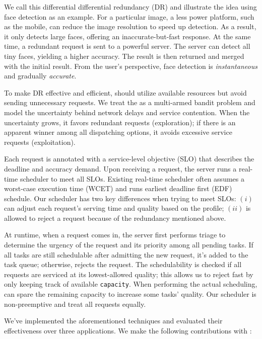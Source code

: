 We call this differential differential redundancy (DR) and illustrate the idea
using face detection as an example. For a particular image, a less power
platform, such as the mobile, can reduce the image resolution to speed up
detection. As a result, it only detects large faces, offering an
inaccurate-but-fast response. At the same time, a redundant request is sent to a
powerful server. The server can detect all tiny faces, yielding a higher
accuracy. The result is then returned and merged with the initial result. From
the user's perspective, face detection is \emph{instantaneous} and gradually
\emph{accurate}.

To make DR effective and efficient, \sysname{} should utilize available
resources but avoid sending unnecessary requests. We treat the as a multi-armed
bandit problem and model the uncertainty behind network delays and service
contention. When the uncertainty grows, it favors redundant requests
(exploration); if there is an apparent winner among all dispatching options, it
avoids excessive service requests (exploitation).

 Each request is annotated with a
service-level objective (SLO) that describes the deadline and accuracy
demand. Upon receiving a request, the server runs a real-time scheduler to meet
all SLOs. Existing real-time scheduler often assumes a worst-case execution time
(WCET) and runs earliest deadline first (EDF) schedule. Our scheduler has two
key differences when trying to meet SLOs: $(i)$ \sysname{} can adjust each
request's serving time and quality based on the profile; $(ii)$ \sysname{} is
allowed to reject a request because of the redundancy mentioned above.

At runtime, when a request comes in, the server first performs triage to
determine the urgency of the request and its priority among all pending
tasks. If all tasks are still schedulable after admitting the new request, it's
added to the task queue; otherwise, \sysname{} rejects the request. The
schedulability is checked if all requests are serviced at its lowest-allowed
quality; this allows us to reject fast by only keeping track of available
\texttt{capacity}. When performing the actual scheduling, \sysname{} can spare
the remaining capacity to increase some tasks' quality. Our scheduler is
non-preemptive and treat all requests equally.

We've implemented the aforementioned techniques and evaluated their
effectiveness over three applications. We make the following contributions with
\sysname{}:

